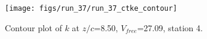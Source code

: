 \begin{figure}[H]
\centering
\texttt{[image: figs/run\_37/run\_37\_ctke\_contour]}
\caption{Contour plot of $k$ at $z/c$=8.50, $V_{free}$=27.09, station 4.}
\label{fig:run_37_ctke_contour}
\end{figure}


